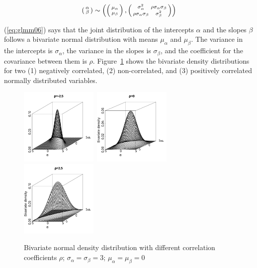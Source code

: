 \begin{equation} 
  \left( \begin{smallmatrix} \alpha \\ \beta \end{smallmatrix}\right) \sim
    \left(
    \left( \begin{smallmatrix} \mu_{\alpha}\vphantom{\beta} \\ \mu_{\beta}\vphantom{\beta} \end{smallmatrix} \right), 
      \left( \begin{smallmatrix} \sigma_{\alpha}^2 & \rho\sigma_{\alpha}\sigma_{\beta} \\
	\rho\sigma_{\alpha}\sigma_{\beta} & \sigma_{\beta}^2 \end{smallmatrix} \right)
    \right)
  \label{eq:glmm06}
\end{equation}

(\ref{eq:glmm06}) says that the joint distribution of the intercepts $\alpha$ and the slopes $\beta$ follows a bivariate normal distribution with means $\mu_{\alpha}$ and $\mu_{\beta}$.
The variance in the intercepts is $\sigma_{\alpha}$, the variance in the slopes is $\sigma_{\beta}$, and the coefficient for the covariance between them is $\rho$.
Figure~\ref{fig:multnorm} shows the bivariate density distributions for two (1) negatively correlated, (2) non-correlated, and (3) positively correlated normally distributed variables.

\begin{figure}[!htpb]
  \centering
  \includegraphics[width=0.33\textwidth]{graphics/multnorm1}~\includegraphics[width=0.33\textwidth]{graphics/multnorm2}~\includegraphics[width=0.33\textwidth]{graphics/multnorm3}
  \caption{Bivariate normal density distribution with different correlation coefficients $\rho$; $\sigma_{\alpha}=\sigma_{\beta}=3$; $\mu_{\alpha}=\mu_{\beta}=0$}
  \label{fig:multnorm}
\end{figure}

